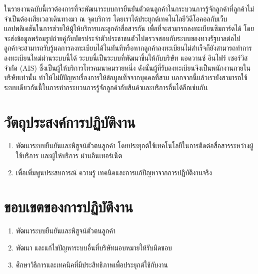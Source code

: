 ในรายงานฉบับนี้เราต้องการที่จะพัฒนาระบบการยืนยันตัวตนลูกค้าในกระบวนการรู้จักลูกค้าที่ลูกค้าไม่จำเป็นต้องเสียเวลาเดินทางมา ณ จุดบริการ โดยเราได้ประยุกต์เทคโนโลยีวิดีโอคอลกับเว็บแอปพลิเคชันในการช่วยให้ผู้ให้บริการและลูกค้าสื่อสารกัน เพื่อที่จะสามารถลงทะเบียนซิมการ์ดได้ โดยจะส่งข้อมูลพร้อมรูปถ่ายคู่กับบัตรประจำตัวประชาชนตัวไปตรวจสอบกับระบบของทางรัฐบาลต่อไป ลูกค้าจะสามารถรับรู้ผลการลงทะเบียบได้ในทันทีหรือหากลูกค้าลงทะเบียนไม่สำเร็จก็ยังสามารถทำการลงทะเบียนใหม่ผ่านระบบนี้ได้ ระบบนี้เป็นระบบที่พัฒนาขึ้นให้กับบริษัท แอดวานซ์ อินโฟร์ เซอร์วิส จำกัด (AIS) ซึ่งเป็นผู้ให้บริการโทรคมนาคมรายหนึ่ง ดังนั้นผู้ที่รับลงทะเบียนจึงเป็นพนักงานภายในบริษัทเท่านั้น ทำให้ไม่มีปัญหาเรื่องการให้ข้อมูลเท็จจากบุคคลที่สาม นอกจากนี้แล้วเรายังสามารถใช้ระบบเดียวกันนี้ในการทำกระบวนการรู้จักลูกค้ากับสินค้าและบริการอื่นได้อีกเช่นกัน

\section{วัตถุประสงค์การปฏิบัติงาน}

\begin{enumerate}
	\item พัฒนาระบบยืนยันและพิสูจน์ตัวตนลูกค้า โดยประยุกต์ใช้เทคโนโลยีในการติดต่อสื่อสารระหว่างผู้ใช้บริการ และผู้ให้บริการ ผ่านอินเทอร์เน็ต
	\item เพื่อเพิ่มพูนประสบการณ์ ความรู้ เทคนิคและการแก้ปัญหาจากการปฏิบัติงานจริง
\end{enumerate}

\section{ขอบเขตของการปฏิบัติงาน}

\begin{enumerate}
	\item พัฒนาระบบยืนยันและพิสูจน์ตัวตนลูกค้า
	\item พัฒนา และแก้ไขปัญหาระบบอื่นที่บริษัทมอบหมายให้รับผิดชอบ
	\item ศึกษาวิธีการและเทคนิคที่มีประสิทธิภาพเพื่อประยุกต์ใช้กับงาน
\end{enumerate}

